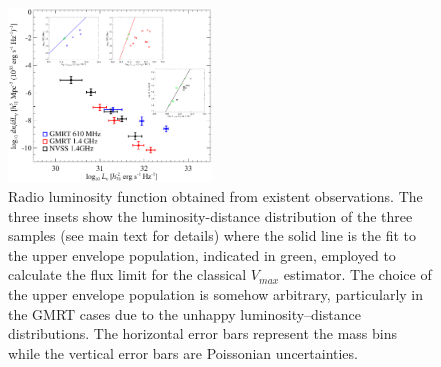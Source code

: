 \documentclass[traditabstract]{aa}
\begin{document}
\begin{appendix}
\begin{figure}[t]
\centering
\includegraphics[width=0.48\textwidth]{figures/RLF_observations.eps}
\caption{Radio luminosity function obtained from existent observations. The three insets show the luminosity-distance distribution of the three samples (see main text for details) where the solid line is the fit to the upper envelope population, indicated in green, employed to calculate the flux limit for the classical $V_{max}$ estimator. The choice of the upper envelope population is somehow arbitrary, particularly in the GMRT cases due to the unhappy luminosity--distance distributions. The horizontal error bars represent the mass bins while the vertical error bars are Poissonian uncertainties.}
\label{fig:RLFobs}
\end{figure}

\end{appendix}





\end{document}
